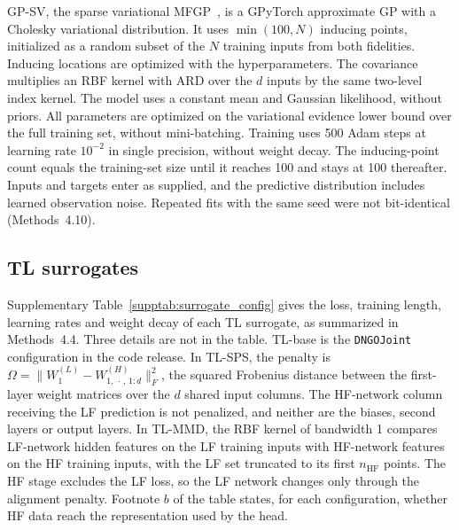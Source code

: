 GP-SV, the sparse variational MFGP~\citep{titsias2009variational,hensman2013gaussian}, is a GPyTorch approximate GP with a Cholesky variational distribution. It uses $\min(100, N)$ inducing points, initialized as a random subset of the $N$ training inputs from both fidelities. Inducing locations are optimized with the hyperparameters. The covariance multiplies an RBF kernel with ARD over the $d$ inputs by the same two-level index kernel. The model uses a constant mean and Gaussian likelihood, without priors. All parameters are optimized on the variational evidence lower bound over the full training set, without mini-batching. Training uses 500 Adam steps at learning rate $10^{-2}$ in single precision, without weight decay. The inducing-point count equals the training-set size until it reaches 100 and stays at 100 thereafter. Inputs and targets enter as supplied, and the predictive distribution includes learned observation noise. Repeated fits with the same seed were not bit-identical (Methods~4.10).


\subsection{TL surrogates}

Supplementary Table~\ref{supptab:surrogate_config} gives the loss, training length, learning rates and weight decay of each TL surrogate, as summarized in Methods~4.4. Three details are not in the table. TL-base is the \texttt{DNGOJoint} configuration in the code release. In TL-SPS, the penalty is $\Omega = \bigl\|W^{(L)}_{1} - W^{(H)}_{1,\,\cdot\,,\,1:d}\bigr\|_F^2$, the squared Frobenius distance between the first-layer weight matrices over the $d$ shared input columns. The HF-network column receiving the LF prediction is not penalized, and neither are the biases, second layers or output layers. In TL-MMD, the RBF kernel of bandwidth 1 compares LF-network hidden features on the LF training inputs with HF-network features on the HF training inputs, with the LF set truncated to its first $n_{\text{HF}}$ points. The HF stage excludes the LF loss, so the LF network changes only through the alignment penalty. Footnote $b$ of the table states, for each configuration, whether HF data reach the representation used by the head.


